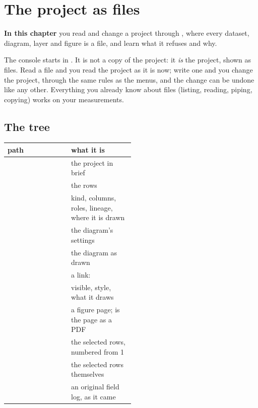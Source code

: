 \chapter{The project as files}\label{ch:project-fs}
\begin{goals}
\textbf{In this chapter} you read and change a project through , where every dataset,
diagram, layer and figure is a file, and learn what it refuses and why.
\end{goals}

The console starts in . It is not a copy of the project: it \emph{is} the project, shown
as files. Read a file and you read the project as it is now; write one and you change the project,
through the same rules as the menus, and the change can be undone like any other. Everything you already
know about files (listing, reading, piping, copying) works on your measurements.

\section{The tree}\label{sec:project-tree}


\begin{center}\small
\begin{tabularx}{\linewidth}{@{}>{\raggedright}p{0.5\linewidth}L@{}}\toprule
\sffamily\bfseries path & \sffamily\bfseries what it is \\\midrule
{} & the project in brief \\
 & the rows \\
 & kind, columns, roles, lineage, where it is drawn \\
 & the diagram's settings \\
 & the diagram as drawn \\
 & a link:  \\
 & visible, style, what it draws \\
 & a figure page;  is the page as a PDF \\
 & the selected rows, numbered from 1 \\
 & the selected rows themselves \\
 & an original field log, as it came \\
\bottomrule\end{tabularx}
\end{center}

